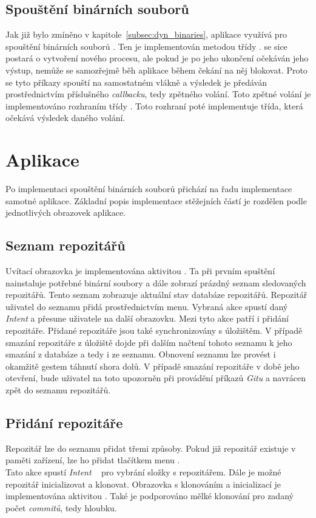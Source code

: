     \subsection{Spouštění binárních souborů}
    Jak již bylo zmíněno v kapitole~\ref{subsec:dyn_binaries}, aplikace využívá pro spouštění binárních souborů . Ten je implementován metodou  třídy .  se sice postará o vytvoření nového procesu, ale pokud je po jeho ukončení očekáván jeho výstup, nemůže se samozřejmě běh aplikace během čekání na něj blokovat. Proto se tyto příkazy spouští na samostatném vlákně a výsledek je předáván prostřednictvím příslušného \emph{callbacku}, tedy zpětného volání. Toto zpětné volání je implementováno rozhraním  třídy . Toto rozhraní poté implementuje třída, která očekává výsledek daného volání.

\section{Aplikace}
Po implementaci spouštění binárních souborů přichází na řadu implementace samotné aplikace. Základní popis implementace stěžejních částí je rozdělen podle jednotlivých obrazovek aplikace.

    \subsection{Seznam repozitářů}
    Uvítací obrazovka je implementována aktivitou . Ta při prvním spuštění nainstaluje potřebné binární soubory a dále zobrazí prázdný seznam sledovaných repozitářů. Tento seznam zobrazuje aktuální stav databáze repozitářů. Repozitář uživatel do seznamu přidá prostřednictvím menu. Vybraná akce spustí daný \emph{Intent} a přesune uživatele na další obrazovku. Mezi tyto akce patří i přidání repozitáře. Přidané repozitáře jsou také synchronizovány s úložištěm. V případě smazání repozitáře z úložiště dojde při dalším načtení tohoto seznamu k jeho smazání z databáze a tedy i ze seznamu. Obnovení seznamu lze provést i okamžitě gestem táhnutí shora dolů. V případě smazání repozitáře v době jeho otevření, bude uživatel na toto upozorněn při provádění příkazů \emph{Gitu} a navrácen zpět do seznamu repozitářů. 

    \subsection{Přidání repozitáře}
    Repozitář lze do seznamu přidat třemi způsoby. Pokud již repozitář existuje v paměti zařízení, lze ho přidat tlačítkem menu .\\ Tato akce spustí \emph{Intent} ~ pro vybrání složky s repozitářem. Dále je možné repozitář inicializovat a klonovat. Obrazovka s klonováním a inicializací je implementována aktivitou . Také je podporováno mělké klonování pro zadaný počet \emph{commitů}, tedy hloubku.

